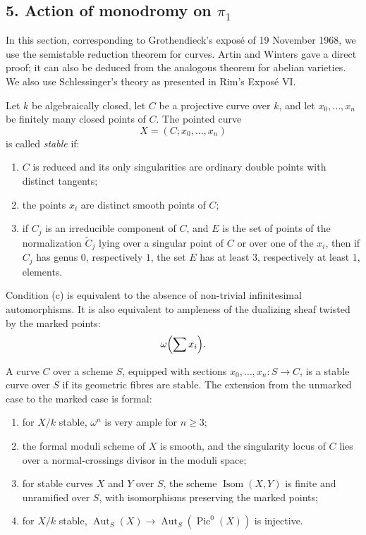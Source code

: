 \documentclass[11pt]{article}
\theoremstyle{plain}
\theoremstyle{definition}
\theoremstyle{remark}
\DeclareMathOperator{\Aut}{Aut}
\DeclareMathOperator{\Isom}{Isom}
\DeclareMathOperator{\Pic}{Pic}
\begin{document}
\subsection*{5. Action of monodromy on $\pi_1$}

In this section, corresponding to Grothendieck's exposé of 19 November 1968, we use the semistable reduction theorem for curves. Artin and Winters gave a direct proof; it can also be deduced from the analogous theorem for abelian varieties. We also use Schlessinger's theory as presented in Rim's Exposé VI.

Let $k$ be algebraically closed, let $C$ be a projective curve over $k$, and let $x_0,\ldots,x_n$ be finitely many closed points of $C$. The pointed curve
\[
X=(C;x_0,\ldots,x_n)
\]
is called \emph{stable} if:
\begin{enumerate}[label=(\alph*)]
\item $C$ is reduced and its only singularities are ordinary double points with distinct tangents;
\item the points $x_i$ are distinct smooth points of $C$;
\item if $C_j$ is an irreducible component of $C$, and $E$ is the set of points of the normalization $\widetilde C_j$ lying over a singular point of $C$ or over one of the $x_i$, then if $C_j$ has genus $0$, respectively $1$, the set $E$ has at least $3$, respectively at least $1$, elements.
\end{enumerate}
Condition (c) is equivalent to the absence of non-trivial infinitesimal automorphisms. It is also equivalent to ampleness of the dualizing sheaf twisted by the marked points:
\[
\omega\Bigl(\sum x_i\Bigr).
\]

A curve $C$ over a scheme $S$, equipped with sections $x_0,\ldots,x_n:S\to C$, is a stable curve over $S$ if its geometric fibres are stable. The extension from the unmarked case to the marked case is formal:
\begin{enumerate}[label=(\arabic*)]
\item for $X/k$ stable, $\omega^n$ is very ample for $n\geq3$;
\item the formal moduli scheme of $X$ is smooth, and the singularity locus of $C$ lies over a normal-crossings divisor in the moduli space;
\item for stable curves $X$ and $Y$ over $S$, the scheme $\Isom(X,Y)$ is finite and unramified over $S$, with isomorphisms preserving the marked points;
\item for $X/k$ stable, $\Aut_S(X)\to\Aut_S(\Pic^0(X))$ is injective.
\end{enumerate}
\end{document}
